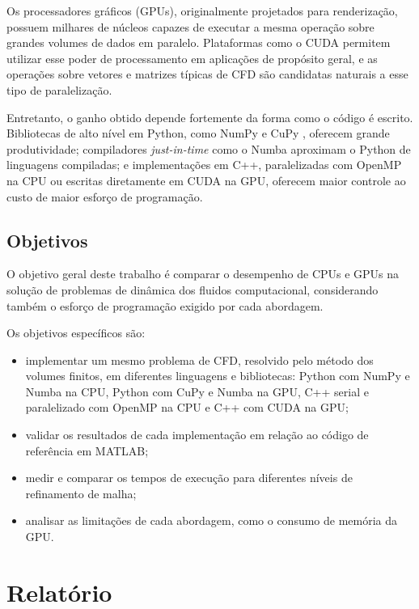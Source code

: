 \documentclass[
    12pt,
    openright,
    oneside,
    a4paper,
    english,
    brazil,
]{abntex2}
\begin{document}
Os processadores gráficos (GPUs), originalmente projetados para renderização, possuem milhares de núcleos capazes de executar a mesma operação sobre grandes volumes de dados em paralelo. Plataformas como o CUDA \cite{nvidia_cuda} permitem utilizar esse poder de processamento em aplicações de propósito geral, e as operações sobre vetores e matrizes típicas de CFD são candidatas naturais a esse tipo de paralelização.

Entretanto, o ganho obtido depende fortemente da forma como o código é escrito. Bibliotecas de alto nível em Python, como NumPy \cite{harris2020} e CuPy \cite{okuta2017}, oferecem grande produtividade; compiladores \emph{just-in-time} como o Numba \cite{lam2015} aproximam o Python de linguagens compiladas; e implementações em C++, paralelizadas com OpenMP \cite{dagum1998} na CPU ou escritas diretamente em CUDA na GPU, oferecem maior controle ao custo de maior esforço de programação.

\section{Objetivos}

O objetivo geral deste trabalho é comparar o desempenho de CPUs e GPUs na solução de problemas de dinâmica dos fluidos computacional, considerando também o esforço de programação exigido por cada abordagem.

Os objetivos específicos são:

\begin{itemize}
    \item implementar um mesmo problema de CFD, resolvido pelo método dos volumes finitos, em diferentes linguagens e bibliotecas: Python com NumPy e Numba na CPU, Python com CuPy e Numba na GPU, C++ serial e paralelizado com OpenMP na CPU e C++ com CUDA na GPU;
    \item validar os resultados de cada implementação em relação ao código de referência em MATLAB;
    \item medir e comparar os tempos de execução para diferentes níveis de refinamento de malha;
    \item analisar as limitações de cada abordagem, como o consumo de memória da GPU.
\end{itemize}

\chapter{Relatório}
\end{document}
